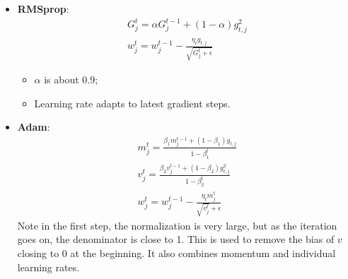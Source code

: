 \documentclass[]{article}
\begin{document}
\begin{itemize}
\begin{itemize}
		\item \textbf{RMSprop}:
		\begin{equation}
		\begin{array}{c}
		G_j^t=\alpha G_j^{t-1}+ (1-\alpha) g_{t,j}^2\\
		w_j^t=w_j^{t-1}-\frac{\eta_t g_{t,j}}{\sqrt{G_j^t+\epsilon}}
		\end{array}
		\end{equation}
		\begin{itemize}
			\item $\alpha$ is about 0.9;
			\item Learning rate adapts to latest gradient steps.
		\end{itemize}
		
		\item \textbf{Adam}:
		\begin{equation}
		\begin{array}{c}
		m_j^t=\frac{\beta_1 m_j^{t-1}+(1-\beta_1)g_{t,j}}{1-\beta_1^t}\\
		v_j^t=\frac{\beta_2 v_j^{t-1}+(1-\beta_2)g_{t,j}^2}{1-\beta_2^t}\\
		w_j^t=w_j^{t-1}-\frac{\eta_t m_{j}^t}{\sqrt{v_j^t}+\epsilon}
		\end{array}
		\end{equation}
		Note in the first step, the normalization is very large, but as the iteration goes on, the denominator is close to 1. This is used to remove the bias of $v$ closing to 0 at the beginning. It also combines momentum and individual learning rates.
	\end{itemize}
\end{itemize}
\end{document}
